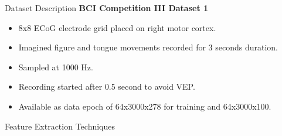 \documentclass[11pt]{beamer}
\begin{document}
\begin{frame}{Dataset Description}
\textbf{BCI Competition III Dataset 1}
  \begin{itemize}
    \item 8x8 ECoG electrode grid placed on right motor cortex.
      \item Imagined figure and tongue movements recorded for 3 seconds duration.
        \item Sampled at 1000 Hz.
        \item Recording started after 0.5 second to avoid VEP.
        \item Available as data epoch of 64x3000x278 for training and 64x3000x100.
     \end{itemize} 
    \end{frame}

\begin{frame}
\Huge{\centerline{Feature Extraction Techniques}}
\end{frame}
\end{document}

